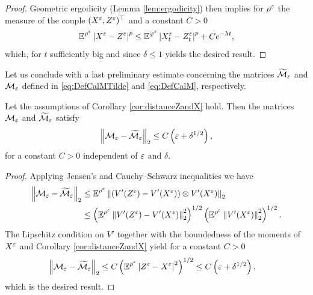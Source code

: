 \documentclass[10pt]{article}
\begin{document}
\begin{appendices}
{\begin{proof}
	Geometric ergodicity (Lemma \ref{lem:ergodicity}) then implies for $\rho^\varepsilon$ the measure of the couple $(X^\varepsilon, Z^\varepsilon)^\top$ and a constant $C > 0$
	\begin{equation}
	\operatorname{\mathbb{E}}^{\rho^\varepsilon} \left\lvert X^\varepsilon - Z^\varepsilon\right\rvert^p \leq \operatorname{\mathbb{E}}^{\varphi^\varepsilon}\left\lvert X_t^\varepsilon - Z_t^\varepsilon\right\rvert^p + Ce^{-\lambda t},
	\end{equation}
	which, for $t$ sufficiently big and since $\delta \leq 1$ yields the desired result.
\end{proof}
}
Let us conclude with a last preliminary estimate concerning the matrices $\widetilde{\mathcal M}_\varepsilon$ and $\mathcal M_\varepsilon$ defined in \eqref{eq:DefCalMTilde} and \eqref{eq:DefCalM}, respectively.

\begin{lemma}\label{lem:distanceMandTildeM} Let the assumptions of Corollary \ref{cor:distanceZandX} hold. Then the matrices $\mathcal M_\varepsilon$ and $\widetilde{\mathcal M}_\varepsilon$ satisfy
	\begin{equation}
	\left\|\mathcal M_\varepsilon - \widetilde{\mathcal M}_\varepsilon\right\|_2 \leq C\left(\varepsilon + \delta^{1/2}\right),
	\end{equation}
	for a constant $C > 0$ independent of $\varepsilon$ and $\delta$.
\end{lemma}
\begin{proof} Applying Jensen's and Cauchy--Schwarz inequalities we have
	\begin{equation}
	\begin{aligned}
	\left\|\mathcal M_\varepsilon - \widetilde{\mathcal M}_\varepsilon\right\|_2 &\leq \operatorname{\mathbb{E}}^{\rho^\varepsilon} \left\|\left(V'(Z^\varepsilon) - V'(X^\varepsilon)\right) \otimes V'(X^\varepsilon)\right\|_2 \\
	&\leq \left(\operatorname{\mathbb{E}}^{\rho^\varepsilon}\left\|V'(Z^\varepsilon) - V'(X^\varepsilon)\right\|_2^2\right)^{1/2} \left(\operatorname{\mathbb{E}}^{\rho^\varepsilon} \left\|V'(X^\varepsilon)\right\|_2^{2}\right)^{1/2}.
	\end{aligned}
	\end{equation}
	The Lipschitz condition on $V'$ together with the boundedness of the moments of $X^\varepsilon$ and Corollary \ref{cor:distanceZandX} yield for a constant $C > 0$
	\begin{equation}
	\begin{aligned}
	\left\|\mathcal M_\varepsilon - \widetilde{\mathcal M}_\varepsilon\right\|_2 &\leq C\left(\operatorname{\mathbb{E}}^{\rho^\varepsilon}\left\lvert Z^\varepsilon - X^\varepsilon\right\rvert^{2}\right)^{1/2} \leq C \left(\varepsilon + \delta^{1/2} \right),
	\end{aligned}
	\end{equation}
	which is the desired result.
\end{proof}


\end{appendices}
\end{document}
